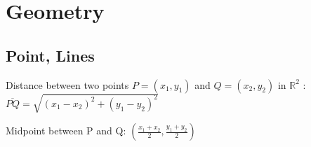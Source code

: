 \documentclass[../formulario.tex]{subfiles}
\begin{document}
\chapter{Geometry}

\section{Point, Lines}
Distance between two points $P=(x_1,y_1)$ and $Q=(x_2,y_2)$ in $\mathbb{R}^2$ : $ \overline{PQ} = \sqrt{(x_1-x_2)^2+(y_1-y_2)^2} $

Midpoint between P and Q: $\left(\frac{x_1+x_2}{2},\frac{y_1+y_2}{2}\right)$
\end{document}

